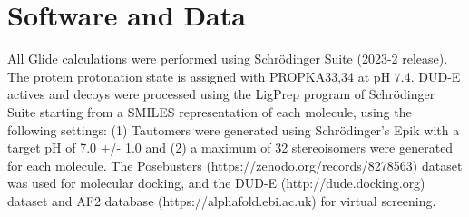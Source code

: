 \documentclass[%
 aip,
 amsmath,amssymb,
reprint,%
]{revtex4-1}
\begin{document}
\section{Software and Data}

All Glide calculations were performed using Schr\"odinger Suite (2023-2 release). The protein protonation state is assigned with PROPKA33,34 at pH 7.4. DUD-E actives and decoys were processed using the LigPrep program of Schr\"odinger Suite starting from a SMILES representation of each molecule, using the following settings: (1) Tautomers were generated using Schr\"odinger’s Epik with a target pH of 7.0 +/- 1.0 and (2) a maximum of 32 stereoisomers were generated for each molecule. The Posebusters (https://zenodo.org/records/8278563) dataset was used for molecular docking, and the DUD-E (http://dude.docking.org) dataset and AF2 database (https://alphafold.ebi.ac.uk) for virtual screening.


\clearpage
\end{document}
